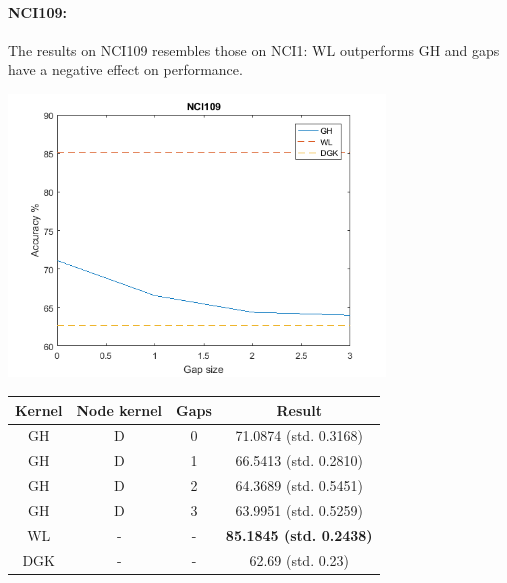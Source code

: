 \documentclass{article}
\begin{document}
\paragraph{NCI109:}
The results on NCI109 resembles those on NCI1: WL outperforms GH and gaps have a negative effect on performance.\\
\begin{minipage}{0.6\linewidth}
	\hspace*{-1in}
	\includegraphics[width=10cm]{nci109} 
	\label{fig:nci109}
\end{minipage}
\begin{minipage}[c]{0.5\linewidth}
	
	\centering
	\begin{tabular}{c|c|c|c}
		Kernel & Node kernel & Gaps & Result\\
		\hline
		GH & D & 0 & 71.0874 (std. 0.3168)\\
		GH & D & 1 & 66.5413 (std. 0.2810)\\
		GH & D & 2 & 64.3689 (std. 0.5451)\\
		GH & D & 3 & 63.9951 (std. 0.5259)\\
		WL & - & - & \textbf{85.1845 (std. 0.2438)}\\
		DGK\cite{yanardag} & - & - & 62.69 (std. 0.23)
	\end{tabular}
	\label{table:nci109}
\end{minipage}
\end{document}
